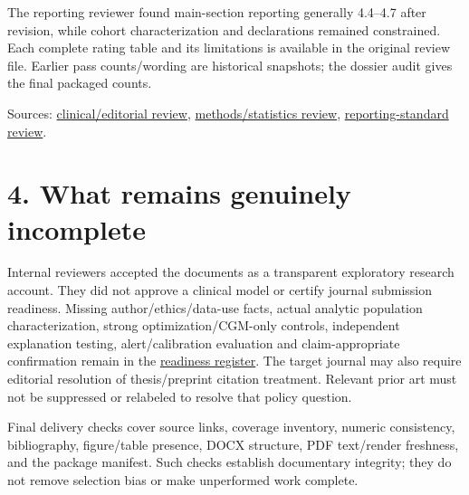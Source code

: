 \documentclass[11pt,a4paper]{article}
\begin{document}
The reporting reviewer found main-section reporting generally 4.4--4.7 after revision, while cohort characterization and declarations remained constrained. Each complete rating table and its limitations is available in the original review file. Earlier pass counts/wording are historical snapshots; the dossier audit gives the final packaged counts.

Sources: \href{reviews/clinical_editor_review_2026_11_08.md}{clinical/editorial review}, \href{reviews/methods_statistics_review_2026_11_08.md}{methods/statistics review}, \href{reviews/reporting_standards_review_2026_11_08.md}{reporting-standard review}.

\section*{4. What remains genuinely incomplete}
Internal reviewers accepted the documents as a transparent exploratory research account. They did not approve a clinical model or certify journal submission readiness. Missing author/ethics/data-use facts, actual analytic population characterization, strong optimization/CGM-only controls, independent explanation testing, alert/calibration evaluation and claim-appropriate confirmation remain in the \href{submission_readiness_2026_11_08.md}{readiness register}. The target journal may also require editorial resolution of thesis/preprint citation treatment. Relevant prior art must not be suppressed or relabeled to resolve that policy question.

Final delivery checks cover source links, coverage inventory, numeric consistency, bibliography, figure/table presence, DOCX structure, PDF text/render freshness, and the package manifest. Such checks establish documentary integrity; they do not remove selection bias or make unperformed work complete.
\end{document}

